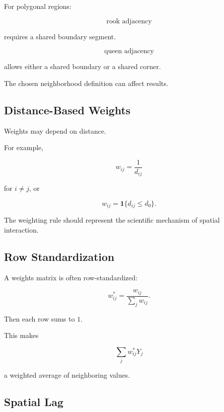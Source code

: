 For polygonal regions:

\[
\boxed{
\text{rook adjacency}
}
\]

requires a shared boundary segment.

\[
\boxed{
\text{queen adjacency}
}
\]

allows either a shared boundary or a shared corner.

The chosen neighborhood definition can affect results.

\subsection{Distance-Based Weights}
\label{subsec:distance-based-spatial-weights}

Weights may depend on distance.

For example,

\[
\boxed{
w_{ij}
=
\frac1{
d_{ij}
}
}
\]

for \(i\neq j\), or

\[
\boxed{
w_{ij}
=
\mathbf{1}
\{
d_{ij}\leq d_0
\}.
}
\]

The weighting rule should represent the scientific mechanism of spatial
interaction.

\subsection{Row Standardization}
\label{subsec:row-standardization-spatial}

A weights matrix is often row-standardized:

\[
\boxed{
w_{ij}^*
=
\frac{
w_{ij}
}{
\sum_jw_{ij}
}.
}
\]

Then each row sums to \(1\).

This makes

\[
\sum_j
w_{ij}^*Y_j
\]

a weighted average of neighboring values.

\subsection{Spatial Lag}
\label{subsec:spatial-lag}

